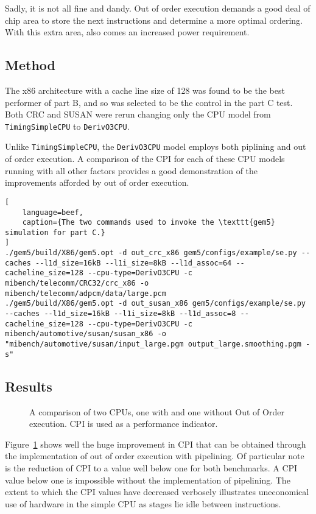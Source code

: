 Sadly, it is not all fine and dandy. Out of order execution demands a good
deal of chip area to store the next instructions and determine a more optimal
ordering. With this extra area, also comes an increased power requirement.

\subsection{Method}

The x86 architecture with a cache line size of 128 was found to be the best
performer of part B, and so was selected to be the control in the part C test.
Both CRC and SUSAN were rerun changing only the CPU model from
\texttt{TimingSimpleCPU} to \texttt{DerivO3CPU}.

Unlike \texttt{TimingSimpleCPU}, the \texttt{DerivO3CPU} model employs both
piplining and out of order execution. A comparison of the CPI for each of these
CPU models running with all other factors provides a good demonstration of the
improvements afforded by out of order execution.

\begin{lstlisting}[
    language=beef,
    caption={The two commands used to invoke the \texttt{gem5} simulation for part C.}
]
./gem5/build/X86/gem5.opt -d out_crc_x86 gem5/configs/example/se.py --caches --l1d_size=16kB --l1i_size=8kB --l1d_assoc=64 --cacheline_size=128 --cpu-type=DerivO3CPU -c mibench/telecomm/CRC32/crc_x86 -o mibench/telecomm/adpcm/data/large.pcm
./gem5/build/X86/gem5.opt -d out_susan_x86 gem5/configs/example/se.py --caches --l1d_size=16kB --l1i_size=8kB --l1d_assoc=8 --cacheline_size=128 --cpu-type=DerivO3CPU -c mibench/automotive/susan/susan_x86 -o "mibench/automotive/susan/input_large.pgm output_large.smoothing.pgm -s"
\end{lstlisting}


\subsection{Results}
\begin{figure}[H]
    \centering
    
    \caption{
        A comparison of two CPUs, one with and one without Out of Order
    execution. CPI is used as a performance indicator.
    }
    \label{fig:partc-cpi}
\end{figure}

Figure~\ref{fig:partc-cpi} shows well the huge improvement in CPI that can be
obtained through the implementation of out of order execution with pipelining.
Of particular note is the reduction of CPI to a value well below one for both
benchmarks. A CPI value below one is impossible without the implementation of
pipelining.
The extent to which the CPI values have decreased verbosely illustrates
uneconomical use of hardware in the simple CPU as stages lie idle between
instructions.

